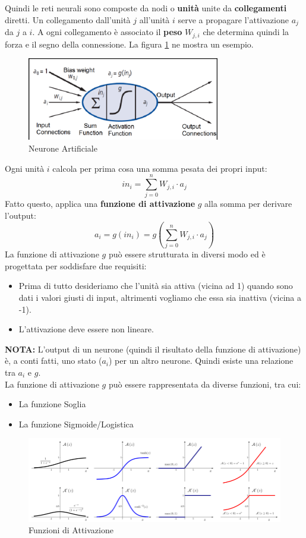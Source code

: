 Quindi le reti neurali sono composte da nodi o \textbf{unità} unite da \textbf{collegamenti} diretti. Un collegamento dall'unità $j$ all'unità $i$ serve a propagare l'attivazione $a_j$ da $j$ a $i$. A ogni collegamento è associato il \textbf{peso} $W_{j,i}$ che determina quindi la forza e il segno della connessione. La figura \ref{Neurone} ne mostra un esempio. 
\begin{figure}[h!]
	\centering
	\includegraphics[width=0.75\textwidth]{img/An-artificial-neuron-and-its-various-components-Adapted-from-Norvig-Russel-2013-p.png}
	\caption{Neurone Artificiale}
	\label{Neurone}
\end{figure}
Ogni unità $i$ calcola per prima cosa una somma pesata dei propri input:
\[in_i=\sum_{j=0}^n W_{j,i}\cdot a_j\]
Fatto questo, applica una \textbf{funzione di attivazione} $g$ alla somma per derivare l'output:
\[a_i=g(in_i)=g\left(\sum_{j=0}^n W_{j,i}\cdot a_j\right)\]
La funzione di attivazione $g$ può essere strutturata in diversi modo ed è progettata per soddisfare due requisiti:
\begin{itemize}
	\item Prima di tutto desideriamo che l'unità sia attiva (vicina ad 1) quando sono dati i valori giusti di input, altrimenti vogliamo che essa sia inattiva (vicina a -1).
	\item L'attivazione deve essere non lineare.
\end{itemize}
\textbf{NOTA:} L'output di un neurone (quindi il risultato della funzione di attivazione) è, a conti fatti, uno stato ($a_i$) per un altro neurone. Quindi esiste una relazione tra $a_i$ e $g$.\\
La funzione di attivazione $g$ può essere rappresentata da diverse funzioni, tra cui:
\begin{itemize}
	\item La funzione Soglia
	\item La funzione Sigmoide/Logistica
\end{itemize}
\begin{figure}[h!]
	\centering
	\includegraphics[width=1\textwidth]{img/Some-of-the-most-common-activation-functions-and-their-first-order-gradient-From-left-to.png}
	\caption{Funzioni di Attivazione}
	\label{ActivationFunction}
\end{figure}
